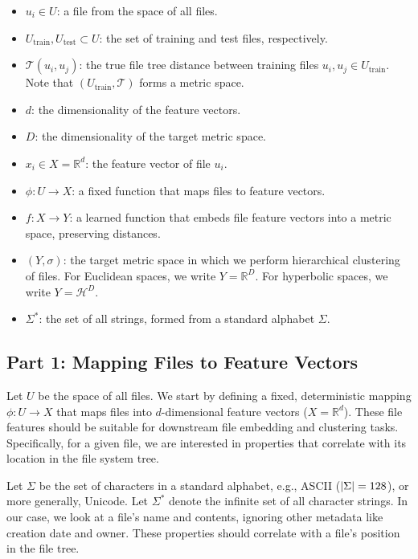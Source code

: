 \documentclass{article}
\begin{document}
\begin{itemize}
  \item $u_i \in U$: a file from the space of all files.
  \item $U_\text{train}, U_\text{test} \subset U$: the set of training and test files, respectively.
  \item $\mathcal T(u_i, u_j)$: the true file tree distance between training files $u_i, u_j \in U_\text{train}$. Note that $(U_\text{train}, \mathcal T)$ forms a metric space.
  \item $d$: the dimensionality of the feature vectors.
  \item $D$: the dimensionality of the target metric space.
  \item $x_i \in X = \mathbb{R}^d$: the feature vector of file $u_i$.
  \item $\phi: U \to X$: a fixed function that maps files to feature vectors.
  \item $f: X \to Y$: a learned function that embeds file feature vectors into a metric space, preserving distances.
  \item $(Y, \sigma)$: the target metric space in which we perform hierarchical clustering of files. For Euclidean spaces, we write $Y = \mathbb R^D$. For hyperbolic spaces, we write $Y = \mathcal H^D$.
  \item $\Sigma^*$: the set of all strings, formed from a standard alphabet $\Sigma$.
\end{itemize}

\subsection{Part 1: Mapping Files to Feature Vectors}

Let $U$ be the space of all files. We start by defining a fixed, deterministic mapping $\phi: U \to X$ that maps files into $d$-dimensional feature vectors ($X = \mathbb R^d$). These file features should be suitable for downstream file embedding and clustering tasks. Specifically, for a given file, we are interested in properties that correlate with its location in the file system tree.

Let $\Sigma$ be the set of characters in a standard alphabet, e.g., ASCII ($\abs{\Sigma} = 128$), or more generally, Unicode. Let $\Sigma^*$ denote the infinite set of all character strings. In our case, we look at a file's name and contents, ignoring other metadata like creation date and owner. These properties should correlate with a file's position in the file tree.
\end{document}
